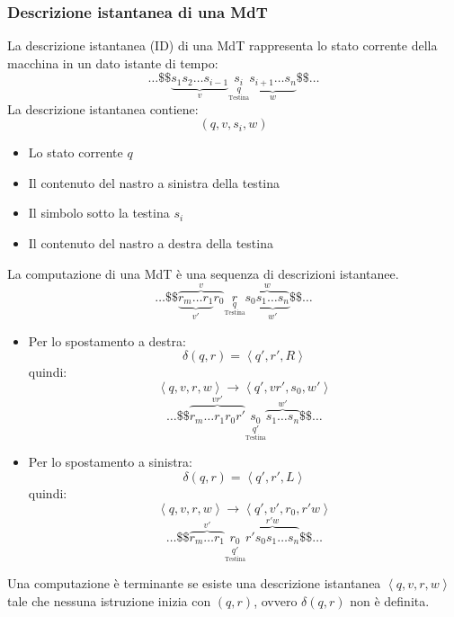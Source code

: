 \documentclass[a4paper]{article}
\begin{document}
\subsubsection{Descrizione istantanea di una MdT}
La descrizione istantanea (ID) di una MdT rappresenta lo stato corrente della macchina
in un dato istante di tempo:
\[
  \ldots \$ \$ \underbrace{s_1 s_2 \ldots s_{i-1}}_{v}
  \underset{\underset{\text{Testina}}{q}}{s_i}
  \underbrace{s_{i+1} \ldots s_n}_{w}
 \$ \$ \ldots
\] 
La descrizione istantanea contiene:
\[
  \left( q, v, s_i, w \right) 
\] 
\begin{itemize}
  \item Lo stato corrente \( q \)
  \item Il contenuto del nastro a sinistra della testina
  \item Il simbolo sotto la testina \( s_i \)
  \item Il contenuto del nastro a destra della testina
\end{itemize}
La computazione di una MdT è una sequenza di descrizioni istantanee.
\[
  \ldots \$ \$ \overbrace{\underbrace{r_m \ldots r_1}_{v'} r_0}^{v}
  \underset{\underset{\text{Testina}}{q}}{r}
  \overbrace{s_0 \underbrace{s_1 \ldots s_n}_{w'}}^{w}
 \$ \$ \ldots
\] 
\begin{itemize}
  \item 
    Per lo spostamento a destra:
    \[
      \delta(q, r) = \left<q', r', R \right>
    \] 
    quindi:
    \[
      \left<q, v, r, w \right> \to \left< q', v r' , s_0, w' \right>
    \] 
    \[
      \ldots \$ \$ \overbrace{r_m \ldots r_1 r_0 r'}^{vr'}
      \underset{\underset{\text{Testina}}{q'}}{s_0}
      \overbrace{s_1 \ldots s_n}^{w'}
      \$ \$ \ldots
    \] 

  \item 
    Per lo spostamento a sinistra:
    \[
      \delta(q, r) = \left<q', r', L \right>
    \] 
    quindi:
    \[
      \left<q, v, r, w \right> \to \left< q', v', r_0, r' w \right>
    \] 
    \[
      \ldots \$ \$ \overbrace{r_m \ldots r_1}^{v'}
      \underset{\underset{\text{Testina}}{q'}}{r_0}
      \overbrace{r' s_0 s_1 \ldots s_n}^{r'w}
      \$ \$ \ldots
    \]
\end{itemize}


\vspace{1em}
\noindent
\begin{definition}
  Una computazione è terminante se esiste una descrizione istantanea
  \( \left<q, v, r, w \right> \) tale che nessuna istruzione inizia con \( (q, r) \),
  ovvero \( \delta(q,r) \) non è definita.
\end{definition}
\end{document}
